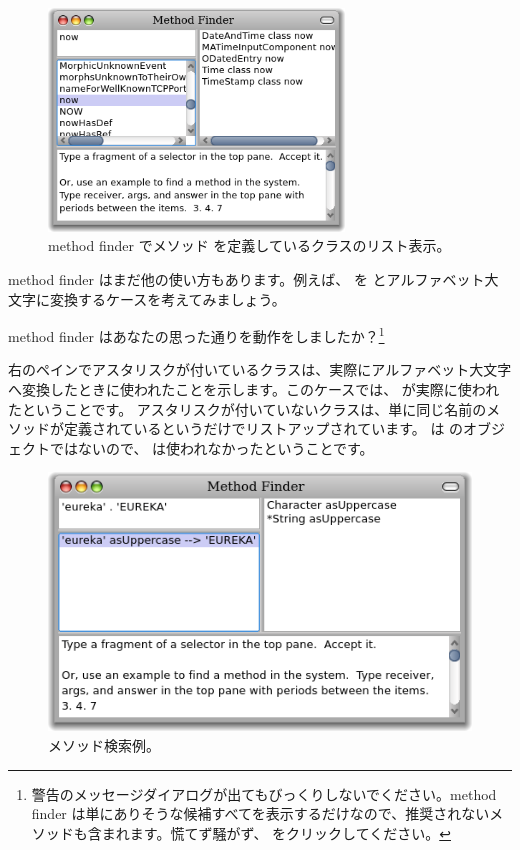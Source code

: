 \documentclass[a4paper,10pt,twoside]{book}
\begin{document}
\begin{figure}[hbt]
\centerline {\includegraphics[width=0.7\textwidth]{methodFinder-now}}
\caption{method finder でメソッド  を定義しているクラスのリスト表示。
}
\end{figure}

method finder はまだ他の使い方もあります。例えば、 を  とアルファベット大文字に変換するケースを考えてみましょう。

\noindent
method finder はあなたの思った通りを動作をしましたか？\footnote{警告のメッセージダイアログが出てもびっくりしないでください。method finder は単にありそうな候補すべてを表示するだけなので、推奨されないメソッドも含まれます。慌てず騒がず、 をクリックしてください。}

右のペインでアスタリスクが付いているクラスは、実際にアルファベット大文字へ変換したときに使われたことを示します。このケースでは、 が実際に使われたということです。
アスタリスクが付いていないクラスは、単に同じ名前のメソッドが定義されているというだけでリストアップされています。 は  のオブジェクトではないので、 は使われなかったということです。

\begin{figure}[hbt]
\centerline {\includegraphics[width=\textwidth]{MethodFinder-example1}}
\caption{メソッド検索例。
}
\end{figure}
\end{document}
